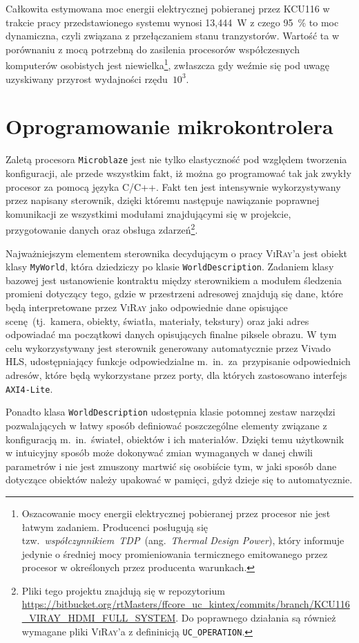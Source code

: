 Całkowita estymowana moc energii elektrycznej pobieranej przez KCU116 w trakcie pracy przedstawionego systemu wynosi 13,444~W z czego 95~\% to moc dynamiczna, czyli związana z przełączaniem stanu tranzystorów. Wartość ta w porównaniu z mocą potrzebną do zasilenia procesorów współczesnych komputerów osobistych jest niewielka\footnote{Oszacowanie mocy energii elektrycznej pobieranej przez procesor nie jest łatwym zadaniem. Producenci posługują się tzw.~\textit{współczynnikiem~TDP}~(ang.~\textit{Thermal Design Power}), który informuje jedynie o średniej mocy promieniowania termicznego emitowanego przez procesor w określonych przez producenta warunkach.}, zwłaszcza gdy weźmie się pod uwagę uzyskiwany przyrost wydajności rzędu~$10^3$.

\section{Oprogramowanie mikrokontrolera}
Zaletą procesora \texttt{Microblaze} jest nie tylko elastyczność pod względem tworzenia konfiguracji, ale przede wszystkim fakt, iż można go programować tak jak zwykły procesor za pomocą języka C/C++. Fakt ten jest intensywnie wykorzystywany przez napisany sterownik, dzięki któremu następuje nawiązanie poprawnej komunikacji ze wszystkimi modułami znajdującymi się w projekcie, przygotowanie danych oraz obsługa zdarzeń\footnote{Pliki tego projektu znajdują się w repozytorium \url{https://bitbucket.org/rtMasters/ffcore_uc_kintex/commits/branch/KCU116_VIRAY_HDMI_FULL_SYSTEM}. Do poprawnego działania są również wymagane pliki \textsc{ViRay}'a z defininicją \texttt{UC\_OPERATION}.}.

Najważniejszym elementem sterownika decydującym o pracy \textsc{ViRay}'a jest obiekt klasy \texttt{MyWorld}, która dziedziczy po klasie \texttt{WorldDescription}. Zadaniem klasy bazowej jest ustanowienie kontraktu między sterownikiem a modułem śledzenia promieni dotyczący tego, gdzie w przestrzeni adresowej znajdują się dane, które będą interpretowane przez \textsc{ViRay} jako odpowiednie dane opisujące scenę~(tj.~kamera, obiekty, światła, materiały, tekstury) oraz jaki adres odpowiadać ma początkowi danych opisujących finalne piksele obrazu.   W tym celu wykorzystywany jest sterownik generowany automatycznie przez Vivado HLS, udostępniający funkcje odpowiedzialne m.~in.~za~przypisanie odpowiednich adresów, które będą wykorzystane przez porty, dla których zastosowano interfejs \texttt{AXI4-Lite}. 

Ponadto klasa \texttt{WorldDescription} udostępnia klasie potomnej zestaw narzędzi pozwalających w łatwy sposób definiować poszczególne elementy związane z konfiguracją m.~in.~świateł, obiektów i ich materiałów. Dzięki temu użytkownik w intuicyjny sposób może dokonywać zmian wymaganych w danej chwili parametrów i nie jest zmuszony martwić się osobiście tym, w jaki sposób dane dotyczące obiektów należy upakować w pamięci, gdyż dzieje się to automatycznie.

